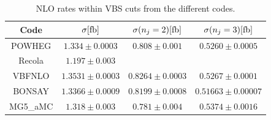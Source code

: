 \documentclass[a4paper,10pt]{report}
\begin{document}
\begin{table}[h!]
    \begin{tabular}{c|c|c|c}
        Code  &  $\sigma[\rm{fb}]$  &  $\sigma(n_j=2)[\rm{fb}]$  &  $\sigma(n_j=3)[\rm{fb}]$\\
        \hline
        \hline
        {\sc POWHEG}  &  $1.334 \pm 0.0003$  &  $0.808 \pm  0.001$  &  $0.5260 \pm 0.0005$\\
        {\sc Recola}  &  $1.197 \pm 0.003 $ \\
        {\sc VBFNLO}  &  $1.3531 \pm 0.0003$  &  $0.8264 \pm  0.0003$  &  $0.5267 \pm 0.0001$\\
        {\sc BONSAY}  &  $1.3366 \pm 0.0009$  &  $0.8199 \pm  0.0008$  &  $0.51663 \pm 0.00007$ \\
        {\sc MG5\_aMC}&  $1.318  \pm 0.003$  &  $0.781 \pm  0.004$  &  $0.5374 \pm 0.0016$\\
    \end{tabular}
    \caption{\label{tab:NLOrates} NLO rates within VBS cuts from the different codes.}
\end{table}
\end{document}
